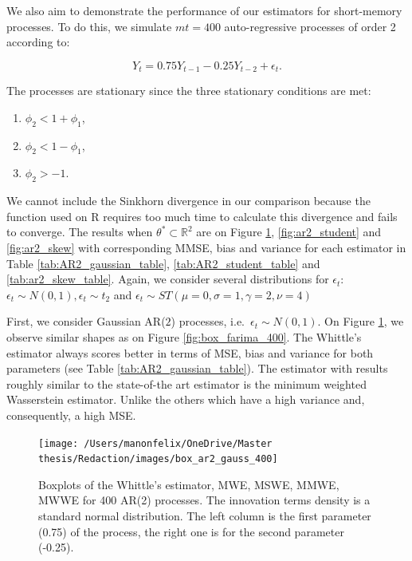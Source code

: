 \documentclass[
  11pt,
]{article}
\providecommand{\tightlist}{%
  \setlength{\itemsep}{0pt}\setlength{\parskip}{0pt}}
\begin{document}
We also aim to demonstrate the performance of our estimators for
short-memory processes. To do this, we simulate \(mt = 400\)
auto-regressive processes of order 2 according to:

\[Y_t = 0.75 Y_{t-1} - 0.25Y_{t-2} + \epsilon_t.\]

The processes are stationary since the three stationary conditions are
met:

\begin{enumerate}
\def\labelenumi{\arabic{enumi}.}
\tightlist
\item
  \(\phi_{2}<1+\phi_{1}\),
\item
  \(\phi_{2}<1-\phi_{1}\),
\item
  \(\phi_{2}>-1\).
\end{enumerate}

We cannot include the Sinkhorn divergence in our comparison because the
function used on R requires too much time to calculate this divergence
and fails to converge. The results when
\(\theta^* \subset \mathbb{R}^2\) are on Figure \ref{fig:ar2_gauss},
\ref{fig:ar2_student} and \ref{fig:ar2_skew} with corresponding MMSE,
bias and variance for each estimator in Table
\ref{tab:AR2_gaussian_table}, \ref{tab:AR2_student_table} and
\ref{tab:ar2_skew_table}. Again, we consider several distributions for
\(\epsilon_t\): \(\epsilon_t \sim N(0,1), \epsilon_t \sim t_2\) and
\(\epsilon_t \sim S T(\mu = 0, \sigma = 1, \gamma = 2, \nu = 4)\)

First, we consider Gaussian AR(\(2\)) processes,
i.e.~\(\epsilon_t \sim N(0,1)\). On Figure \ref{fig:ar2_gauss}, we observe similar shapes as on Figure \ref{fig:box_farima_400}. The Whittle's estimator always scores
better in terms of MSE, bias and variance for both parameters (see Table
\ref{tab:AR2_gaussian_table}). The estimator with results roughly similar
to the state-of-the art estimator is the minimum weighted Wasserstein
estimator. Unlike the others which have a high variance and,
consequently, a high MSE.

\begin{figure}

{\centering \texttt{[image: /Users/manonfelix/OneDrive/Master thesis/Redaction/images/box\_ar2\_gauss\_400]} 

}

\caption{Boxplots of the Whittle's estimator, MWE, MSWE, MMWE, MWWE for 400 AR(2) processes. The innovation terms density is a standard normal distribution. The left column is the first parameter (0.75) of the process, the right one is for the second parameter (-0.25).}\label{fig:ar2_gauss}
\end{figure}
\end{document}
